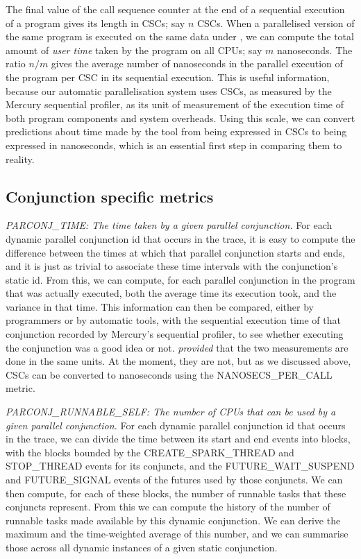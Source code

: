 The final value of the call sequence counter
at the end of a sequential execution of a program 
gives its length in CSCs; say $n$ CSCs.
When a parallelised version of the same program is executed on the same data
under \tscope,
we can compute the total amount of \emph{user time}
taken by the program on all CPUs; say $m$ nanoseconds.
The ratio $n/m$ gives the average number of nanoseconds
in the parallel execution of the program
per CSC in its sequential execution.
This is useful information,
because our automatic parallelisation system
uses CSCs, as measured by the Mercury sequential profiler,
as its unit of measurement of the execution time 
of both program components and system overheads.
Using this scale, we can convert predictions about time made by the tool
from being expressed in CSCs to being expressed in nanoseconds,
which is an essential first step in comparing them to reality.

\subsection{Conjunction specific metrics}

\emph{PARCONJ\_TIME: The time taken by a given parallel conjunction.}
For each dynamic parallel conjunction id that occurs in the trace,
it is easy to compute the difference between
the times at which that parallel conjunction starts and ends,
and it is just as trivial to associate these time intervals
with the conjunction's static id.
From this, we can compute,
for each parallel conjunction in the program that was actually executed,
both the average time its execution took,
and the variance in that time.
This information can then be compared,
either by programmers or by automatic tools,
with the sequential execution time of that conjunction recorded by
Mercury's sequential profiler,
to see whether executing the conjunction was a good idea or not.
\emph{provided} that the two measurements are done in the same units.
At the moment, they are not, but as we discussed above,
CSCs can be converted to nanoseconds using the NANOSECS\_PER\_CALL metric.

\emph{PARCONJ\_RUNNABLE\_SELF:
The number of CPUs that can be used by a given parallel conjunction.}
For each dynamic parallel conjunction id that occurs in the trace,
we can divide the time between its start and end events into blocks,
with the blocks bounded by
the CREATE\_SPARK\_THREAD and STOP\_THREAD events for its conjuncts,
and the FUTURE\_WAIT\_SUSPEND and FUTURE\_SIGNAL events
of the futures used by those conjuncts.
We can then compute, for each of these blocks,
the number of runnable tasks that these conjuncts represent.
From this we can compute the history of the number
of runnable tasks made available by this dynamic conjunction.
We can derive the maximum and the time-weighted average of this number,
and we can summarise those
across all dynamic instances of a given static conjunction.

